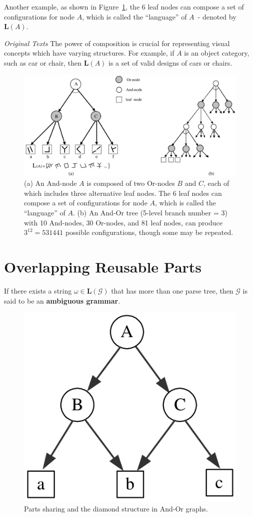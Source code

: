 \documentclass[10pt,oneside]{book}
\newcommand{\Fig}[1]{Figure~\ref{fig:#1}}
\newenvironment{book_quote}[1]
{%
  \mdfsetup{%
    frametitle={\colorbox{white}{\space#1\space}},
    frametitleaboveskip=-\ht\strutbox,
  }
  \begin{mdframed}
}
{
  \end{mdframed}
}
\begin{document}
Another example, as shown in \Fig{ii.1.4}, the 6 leaf nodes can compose a set
of configurations for node $A$, which is called the ``language'' of $A$~-
denoted by $\mathbf{L}(A)$.

\begin{book_quote}{\textit{Original Texts}}
The power of composition is crucial for representing visual concepts which have
varying structures. For example, if $A$ is an object category, such as car or
chair, then $\mathbf{L}(A)$ is a set of valid designs of cars or chairs.
\end{book_quote}
%
\begin{figure}[!htpb]
  \centering
  \includegraphics[width=0.8\linewidth]{./fig/fig_ii_1_4.png}
  \caption{(a) An And-node $A$ is composed of two Or-nodes $B$ and $C$, each of
    which includes three alternative leaf nodes. The 6 leaf nodes can compose a
    set of configurations for node $A$, which is called the ``language'' of
    $A$. (b) An And-Or tree (5-level branch number = 3) with 10 And-nodes, 30
    Or-nodes, and 81 leaf nodes, can produce $3^{12} = 531441$ possible
    configurations, though some may be repeated.}%
  \label{fig:ii.1.4}
\end{figure}
%

\section{Overlapping Reusable Parts}%
\label{sec:ii.1.3}
If there exists a string $\omega \in \mathbf{L}(\mathcal{G})$ that has more
than one parse tree, then $\mathcal{G}$ is said to be an \textbf{ambiguous
grammar}.
%
\begin{figure}[!htpb]
  \centering
  \includegraphics[width=0.35\linewidth]{./fig/fig_ii_1_5.png}
  \caption{Parts sharing and the diamond structure in And-Or graphs.}%
  \label{fig:ii.1.5}
\end{figure}
%
\end{document}
